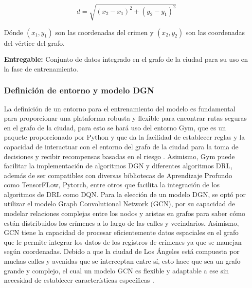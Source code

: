 \begin{itemize}
\begin{equation} 
	d=\sqrt{(x_{2}-x_{1})^{2}+(y_{2}-y_{1})^{2}}
\end{equation}

Dónde $(x_{1},y_{1})$ son las coordenadas del crimen y $(x_{2},y_{2})$ son las coordenadas del vértice del grafo.

\textbf{Entregable:} Conjunto de datos integrado en el grafo de la ciudad para su uso en la fase de entrenamiento.

\end{itemize}

\subsubsection{Definición de entorno y modelo DGN}

La definición de un entorno para el entrenamiento del modelo es fundamental para proporcionar una plataforma robusta y flexible para encontrar rutas seguras en el grafo de la ciudad, para esto se hará uso del entorno Gym, que es un paquete proporcionado por Python y que da la facilidad de establecer reglas y la capacidad de interactuar con el entorno del grafo de la ciudad para la toma de decisiones y recibir recompensas basadas en el riesgo \parencite{gl_gym}. Asimismo, Gym puede facilitar la implementación de algoritmos DGN y diferentes algoritmos DRL, además de ser compatibles con diversas bibliotecas de Aprendizaje Profundo como TensorFLow, Pytorch, entre otros que facilita la integración de los algoritmos de DRL como DQN.
Para la elección de un modelo DGN, se optó por utilizar el modelo Graph Convolutional Network (GCN), por su capacidad de modelar relaciones complejas entre los nodos y aristas en grafos para saber cómo están distribuidos los crímenes a lo largo de las calles y vecindarios. Asimismo, GCN tiene la capacidad de procesar eficientemente datos espaciales en el grafo que le permite integrar los datos de los registros de crímenes ya que se manejan según coordenadas. Debido a que la ciudad de Los Ángeles está compuesta por muchas calles y avenidas que se interceptan entre sí, esto hace que sea un grafo grande y complejo, el cual un modelo GCN es flexible y adaptable a ese sin necesidad de establecer características específicas \parencite{gl_git}.
\medskip

